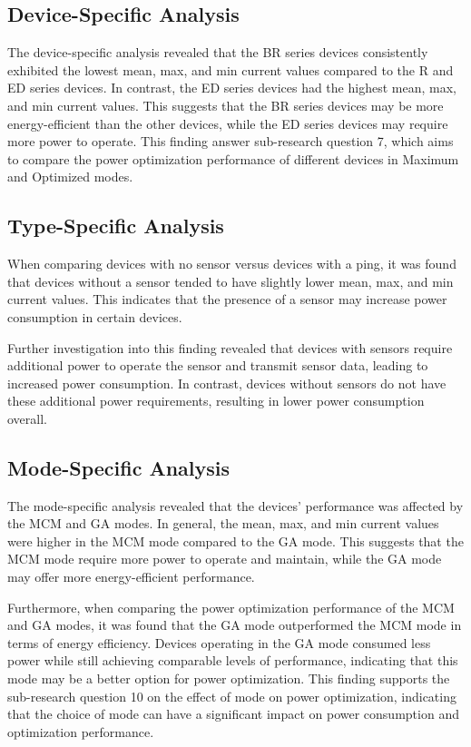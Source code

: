 \subsection{Device-Specific Analysis}

The device-specific analysis revealed that the BR series devices consistently exhibited the lowest mean, max, and min current values compared to the R and ED series devices. In contrast, the ED series devices had the highest mean, max, and min current values. This suggests that the BR series devices may be more energy-efficient than the other devices, while the ED series devices may require more power to operate. This finding answer sub-research question 7, which aims to compare the power optimization performance of different devices in Maximum and Optimized modes.


\subsection{Type-Specific Analysis}

When comparing devices with no sensor versus devices with a ping, it was found that devices without a sensor tended to have slightly lower mean, max, and min current values. This indicates that the presence of a sensor may increase power consumption in certain devices.

Further investigation into this finding revealed that devices with sensors require additional power to operate the sensor and transmit sensor data, leading to increased power consumption. In contrast, devices without sensors do not have these additional power requirements, resulting in lower power consumption overall.


\subsection{Mode-Specific Analysis}

The mode-specific analysis revealed that the devices' performance was affected by the MCM and GA modes. In general, the mean, max, and min current values were higher in the MCM mode compared to the GA mode. This suggests that the MCM mode require more power to operate and maintain, while the GA mode may offer more energy-efficient performance.

Furthermore, when comparing the power optimization performance of the MCM and GA modes, it was found that the GA mode outperformed the MCM mode in terms of energy efficiency. Devices operating in the GA mode consumed less power while still achieving comparable levels of performance, indicating that this mode may be a better option for power optimization. This finding supports the sub-research question 10 on the effect of mode on power optimization, indicating that the choice of mode can have a significant impact on power consumption and optimization performance.


